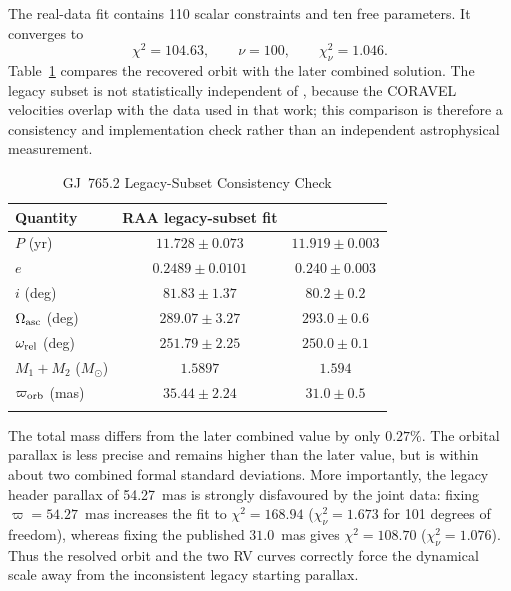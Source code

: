 The real-data fit contains 110 scalar constraints and ten free parameters. It converges to
\begin{equation}
\chi^2=104.63,\qquad \nu=100,\qquad \chi^2_\nu=1.046.
\end{equation}
Table~\ref{tab:gl765} compares the recovered orbit with the later combined solution. The legacy subset is not statistically independent of \citet{Balega2007}, because the CORAVEL velocities overlap with the data used in that work; this comparison is therefore a consistency and implementation check rather than an independent astrophysical measurement.

\begin{table}
\begin{center}
\caption{GJ~765.2 Legacy-Subset Consistency Check}
\label{tab:gl765}
\begin{tabular}{lcc}
\hline\noalign{\smallskip}
Quantity & RAA legacy-subset fit & \citet{Balega2007}\\
\hline\noalign{\smallskip}
$P$ (yr) & $11.728\pm0.073$ & $11.919\pm0.003$\\
$e$ & $0.2489\pm0.0101$ & $0.240\pm0.003$\\
$i$ (deg) & $81.83\pm1.37$ & $80.2\pm0.2$\\
$\Omega_{\rm asc}$ (deg) & $289.07\pm3.27$ & $293.0\pm0.6$\\
$\omega_{\rm rel}$ (deg) & $251.79\pm2.25$ & $250.0\pm0.1$\\
$M_1+M_2$ ($M_\odot$) & $1.5897$ & $1.594$\\
$\varpi_{\rm orb}$ (mas) & $35.44\pm2.24$ & $31.0\pm0.5$\\
\noalign{\smallskip}\hline
\end{tabular}
\end{center}
\end{table}

The total mass differs from the later combined value by only $0.27\%$. The orbital parallax is less precise and remains higher than the later value, but is within about two combined formal standard deviations. More importantly, the legacy header parallax of 54.27~mas is strongly disfavoured by the joint data: fixing $\varpi=54.27$~mas increases the fit to $\chi^2=168.94$ ($\chi^2_\nu=1.673$ for 101 degrees of freedom), whereas fixing the published $31.0$~mas gives $\chi^2=108.70$ ($\chi^2_\nu=1.076$). Thus the resolved orbit and the two RV curves correctly force the dynamical scale away from the inconsistent legacy starting parallax.

